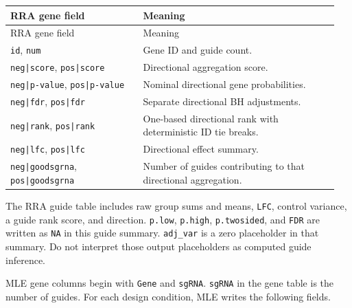 \documentclass[11pt,a4paper]{article}
\begin{document}
\begingroup\small\setlength{\tabcolsep}{5pt}
\begin{longtable}{@{}>{\raggedright\arraybackslash}p{0.38\linewidth}>{\raggedright\arraybackslash}p{0.57\linewidth}@{}}
\toprule
RRA gene field & Meaning \\
\midrule\endfirsthead
\toprule
RRA gene field & Meaning \\
\midrule\endhead
\bottomrule\endfoot
\texttt{\small id}, \texttt{\small num} & Gene ID and guide count. \\
\texttt{\small neg|\allowbreak{}score}, \texttt{\small pos|\allowbreak{}score} & Directional aggregation score. \\
\texttt{\small neg|\allowbreak{}p-\allowbreak{}value}, \texttt{\small pos|\allowbreak{}p-\allowbreak{}value} & Nominal directional gene probabilities. \\
\texttt{\small neg|\allowbreak{}fdr}, \texttt{\small pos|\allowbreak{}fdr} & Separate directional BH adjustments. \\
\texttt{\small neg|\allowbreak{}rank}, \texttt{\small pos|\allowbreak{}rank} & One-based directional rank with deterministic ID tie breaks. \\
\texttt{\small neg|\allowbreak{}lfc}, \texttt{\small pos|\allowbreak{}lfc} & Directional effect summary. \\
\texttt{\small neg|\allowbreak{}goodsgrna}, \texttt{\small pos|\allowbreak{}goodsgrna} & Number of guides contributing to that directional aggregation. \\
\end{longtable}\endgroup

The RRA guide table includes raw group sums and means, \texttt{\small LFC}, control variance, a guide rank score, and direction. \texttt{\small p.\allowbreak{}low}, \texttt{\small p.\allowbreak{}high}, \texttt{\small p.\allowbreak{}twosided}, and \texttt{\small FDR} are written as \texttt{\small NA} in this guide summary. \texttt{\small adj\_\allowbreak{}var} is a zero placeholder in that summary. Do not interpret those output placeholders as computed guide inference.

MLE gene columns begin with \texttt{\small Gene} and \texttt{\small sgRNA}. \texttt{\small sgRNA} in the gene table is the number of guides. For each design condition, MLE writes the following fields.
\end{document}
